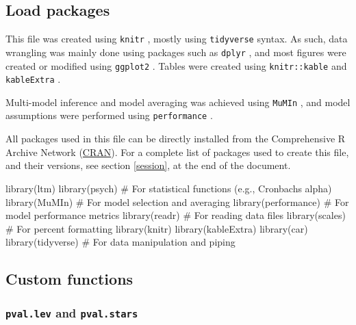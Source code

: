 \documentclass[
  bookmarksnumbered]{article}
\newenvironment{Shaded}{\begin{snugshade}}{\end{snugshade}}
\newcommand{\CommentTok}[1]{\textcolor[rgb]{0.50,0.62,0.50}{#1}}
\newcommand{\FunctionTok}[1]{\textcolor[rgb]{0.94,0.94,0.56}{#1}}
\newcommand{\NormalTok}[1]{\textcolor[rgb]{0.80,0.80,0.80}{#1}}
\begin{document}
\subsection{Load packages}\label{load-packages}

This file was created using \texttt{knitr} \autocite{knitrcit}, mostly using \texttt{tidyverse} \autocite{tidyversecit} syntax. As such, data wrangling was mainly done using packages such as \texttt{dplyr} \autocite{dplyrcit}, and most figures were created or modified using \texttt{ggplot2} \autocite{ggplotcit}. Tables were created using \texttt{knitr::kable} and \texttt{kableExtra} \autocite{kableExtracit}.

Multi-model inference and model averaging was achieved using \texttt{MuMIn} \autocite{MuMIncit}, and model assumptions were performed using \texttt{performance} \autocite{ludecke2021}.

All packages used in this file can be directly installed from the Comprehensive R Archive Network (\href{https://cran.r-project.org/}{CRAN}). For a complete list of packages used to create this file, and their versions, see section \ref{session}, at the end of the document.

\begin{Shaded}
\begin{Highlighting}[]
\FunctionTok{library}\NormalTok{(ltm)}
\FunctionTok{library}\NormalTok{(psych)        }\CommentTok{\# For statistical functions (e.g., Cronbach\textquotesingle{}s alpha)}
\FunctionTok{library}\NormalTok{(MuMIn)        }\CommentTok{\# For model selection and averaging}
\FunctionTok{library}\NormalTok{(performance)  }\CommentTok{\# For model performance metrics}
\FunctionTok{library}\NormalTok{(readr)        }\CommentTok{\# For reading data files}
\FunctionTok{library}\NormalTok{(scales)       }\CommentTok{\# For percent formatting}
\FunctionTok{library}\NormalTok{(knitr)}
\FunctionTok{library}\NormalTok{(kableExtra)}
\FunctionTok{library}\NormalTok{(car)}
\FunctionTok{library}\NormalTok{(tidyverse)    }\CommentTok{\# For data manipulation and piping}
\end{Highlighting}
\end{Shaded}

\subsection{Custom functions}\label{custom-functions}

\subsubsection{\texorpdfstring{\texttt{pval.lev} and \texttt{pval.stars}}{pval.lev and pval.stars}}\label{pval.lev-and-pval.stars}
\end{document}
